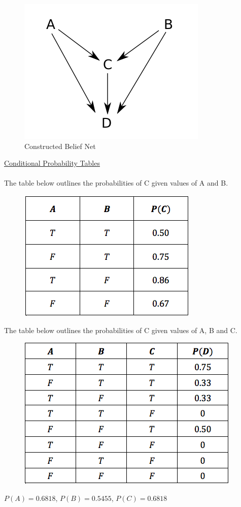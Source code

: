 \documentclass[english]{article}
\begin{document}
\begin{enumerate}
    \begin{figure}[H]
    \centering
    \includegraphics[scale = 0.5]{belief_net}
    \caption{Constructed Belief Net}
    \label{fig:belief_net}
    \end{figure}
    
    \underline{Conditional Probability Tables} \\ \\
    The table below outlines the probabilities of C given values of A and B.
    \begin{figure}[H]
    \centering
    \includegraphics[scale = 0.5]{T1}
    \label{fig:T1}
    \end{figure}
    
    The table below outlines the probabilities of C given values of A, B and C.
    \begin{figure}[H]
    \centering
    \includegraphics[scale = 0.5]{T2}
    \label{fig:T2}
    \end{figure}
    
    $P(A) = 0.6818$, $P(B) = 0.5455$, $P(C) = 0.6818$
    
\end{enumerate}
\end{document}
